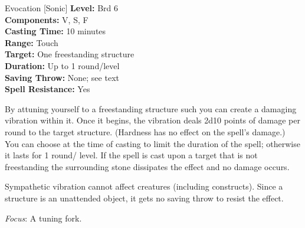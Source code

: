 {Evocation [Sonic]}
{
	\textbf{Level:}
	Brd 6\\
	\textbf{Components:}
	V, S, F\\
	\textbf{Casting Time:}
	10 minutes\\
	\textbf{Range:}
	Touch\\
	\textbf{Target:}
	One freestanding structure\\
	\textbf{Duration:}
	Up to 1 round/level\\
	\textbf{Saving Throw:}
	None; see text\\
	\textbf{Spell Resistance:}
	Yes\\
}
{
	By attuning yourself to a freestanding structure such you can create a damaging vibration within it. Once it begins, the vibration deals 2d10 points of damage per round to the target structure. (Hardness has no effect on the spell's damage.) You can choose at the time of casting to limit the duration of the spell; otherwise it lasts for 1 round/ level. If the spell is cast upon a target that is not freestanding the surrounding stone dissipates the effect and no damage occurs.

	Sympathetic vibration cannot affect creatures (including constructs). Since a structure is an unattended object, it gets no saving throw to resist the effect.

	\textit{Focus}:
	A tuning fork.

}
